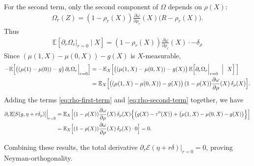\documentclass{article}
\theoremstyle{plain}
\theoremstyle{definition}
\theoremstyle{remark}
\newcommand{\E}{\mathbb{E}}                %
\newcommand{\1}{\mathds{1}}                %
\begin{document}
For the second term, only the second component of $\Omega$ depends on $\rho(X)$:
\begin{align}
\Omega_r(Z)
=(1-\rho_r(X))\frac{\partial\omega}{\partial\rho_r}(X)\big(R-\rho_r(X)\big).
\end{align}
Thus 
\begin{align}
    \E\left[\partial_r\Omega_r|_{r=0} \mid X\right] = (1-\rho_r(X))\frac{\partial\omega}{\partial\rho_r}(X)\cdot -\delta_\rho
\end{align}
Since $(\mu(1,X)-\mu(0,X))-g(X)$ is $X$-measurable,
\begin{align}
-\E\Big[\big((\mu(1)-\mu(0))-g\big)\,\partial_r\Omega_r\Big|_{r=0}\Big]
&=
-\E_X\Big[
\big((\mu(1,X)-\mu(0,X))-g(X)\big)\,
\E\!\left[\partial_r\Omega_r\Big|_{r=0}\ \Bigm|\ X\right]
\Big] \notag\\
&=
\E_X\Big[
\big((\mu(1,X)-\mu(0,X))-g(X)\big)\,
(1-\rho(X))\frac{\partial\omega}{\partial\rho}(X)\,\delta_\rho(X)
\Big].
\label{eq:rho-second-term}
\end{align}
Adding the terms \eqref{eq:rho-first-term} and \eqref{eq:rho-second-term} together, we have
\begin{align}
\partial_r \E[S(g,\eta+r\delta_\rho)]\Big|_{r=0}
&=
\E_X\Big[
(1-\rho(X))\frac{\partial\omega}{\partial\rho}(X)\,\delta_\rho(X)
\Big\{\big(g(X)-\tau^0(X)\big)+\big(\mu(1,X)-\mu(0,X)-g(X)\big)\Big\}
\Big] \notag\\
&=
\E_X\Big[
(1-\rho(X))\frac{\partial\omega}{\partial\rho}(X)\,\delta_\rho(X)\cdot 0
\Big]=0.
\end{align}



Combining these results, the total derivative $\partial_r \mathcal{E}(\eta + r\delta)|_{r=0} = 0$, proving Neyman-orthogonality.
\end{document}
